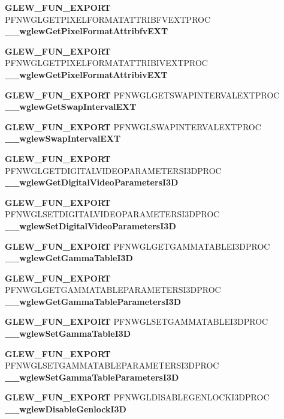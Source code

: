 \begin{DoxyCompactItemize}
\item 
{\bf G\+L\+E\+W\+\_\+\+F\+U\+N\+\_\+\+E\+X\+P\+O\+RT} P\+F\+N\+W\+G\+L\+G\+E\+T\+P\+I\+X\+E\+L\+F\+O\+R\+M\+A\+T\+A\+T\+T\+R\+I\+B\+F\+V\+E\+X\+T\+P\+R\+OC {\bf \+\_\+\+\_\+wglew\+Get\+Pixel\+Format\+Attribfv\+E\+XT}
\item 
{\bf G\+L\+E\+W\+\_\+\+F\+U\+N\+\_\+\+E\+X\+P\+O\+RT} P\+F\+N\+W\+G\+L\+G\+E\+T\+P\+I\+X\+E\+L\+F\+O\+R\+M\+A\+T\+A\+T\+T\+R\+I\+B\+I\+V\+E\+X\+T\+P\+R\+OC {\bf \+\_\+\+\_\+wglew\+Get\+Pixel\+Format\+Attribiv\+E\+XT}
\item 
{\bf G\+L\+E\+W\+\_\+\+F\+U\+N\+\_\+\+E\+X\+P\+O\+RT} P\+F\+N\+W\+G\+L\+G\+E\+T\+S\+W\+A\+P\+I\+N\+T\+E\+R\+V\+A\+L\+E\+X\+T\+P\+R\+OC {\bf \+\_\+\+\_\+wglew\+Get\+Swap\+Interval\+E\+XT}
\item 
{\bf G\+L\+E\+W\+\_\+\+F\+U\+N\+\_\+\+E\+X\+P\+O\+RT} P\+F\+N\+W\+G\+L\+S\+W\+A\+P\+I\+N\+T\+E\+R\+V\+A\+L\+E\+X\+T\+P\+R\+OC {\bf \+\_\+\+\_\+wglew\+Swap\+Interval\+E\+XT}
\item 
{\bf G\+L\+E\+W\+\_\+\+F\+U\+N\+\_\+\+E\+X\+P\+O\+RT} P\+F\+N\+W\+G\+L\+G\+E\+T\+D\+I\+G\+I\+T\+A\+L\+V\+I\+D\+E\+O\+P\+A\+R\+A\+M\+E\+T\+E\+R\+S\+I3\+D\+P\+R\+OC {\bf \+\_\+\+\_\+wglew\+Get\+Digital\+Video\+Parameters\+I3D}
\item 
{\bf G\+L\+E\+W\+\_\+\+F\+U\+N\+\_\+\+E\+X\+P\+O\+RT} P\+F\+N\+W\+G\+L\+S\+E\+T\+D\+I\+G\+I\+T\+A\+L\+V\+I\+D\+E\+O\+P\+A\+R\+A\+M\+E\+T\+E\+R\+S\+I3\+D\+P\+R\+OC {\bf \+\_\+\+\_\+wglew\+Set\+Digital\+Video\+Parameters\+I3D}
\item 
{\bf G\+L\+E\+W\+\_\+\+F\+U\+N\+\_\+\+E\+X\+P\+O\+RT} P\+F\+N\+W\+G\+L\+G\+E\+T\+G\+A\+M\+M\+A\+T\+A\+B\+L\+E\+I3\+D\+P\+R\+OC {\bf \+\_\+\+\_\+wglew\+Get\+Gamma\+Table\+I3D}
\item 
{\bf G\+L\+E\+W\+\_\+\+F\+U\+N\+\_\+\+E\+X\+P\+O\+RT} P\+F\+N\+W\+G\+L\+G\+E\+T\+G\+A\+M\+M\+A\+T\+A\+B\+L\+E\+P\+A\+R\+A\+M\+E\+T\+E\+R\+S\+I3\+D\+P\+R\+OC {\bf \+\_\+\+\_\+wglew\+Get\+Gamma\+Table\+Parameters\+I3D}
\item 
{\bf G\+L\+E\+W\+\_\+\+F\+U\+N\+\_\+\+E\+X\+P\+O\+RT} P\+F\+N\+W\+G\+L\+S\+E\+T\+G\+A\+M\+M\+A\+T\+A\+B\+L\+E\+I3\+D\+P\+R\+OC {\bf \+\_\+\+\_\+wglew\+Set\+Gamma\+Table\+I3D}
\item 
{\bf G\+L\+E\+W\+\_\+\+F\+U\+N\+\_\+\+E\+X\+P\+O\+RT} P\+F\+N\+W\+G\+L\+S\+E\+T\+G\+A\+M\+M\+A\+T\+A\+B\+L\+E\+P\+A\+R\+A\+M\+E\+T\+E\+R\+S\+I3\+D\+P\+R\+OC {\bf \+\_\+\+\_\+wglew\+Set\+Gamma\+Table\+Parameters\+I3D}
\item 
{\bf G\+L\+E\+W\+\_\+\+F\+U\+N\+\_\+\+E\+X\+P\+O\+RT} P\+F\+N\+W\+G\+L\+D\+I\+S\+A\+B\+L\+E\+G\+E\+N\+L\+O\+C\+K\+I3\+D\+P\+R\+OC {\bf \+\_\+\+\_\+wglew\+Disable\+Genlock\+I3D}

\end{DoxyCompactItemize}
